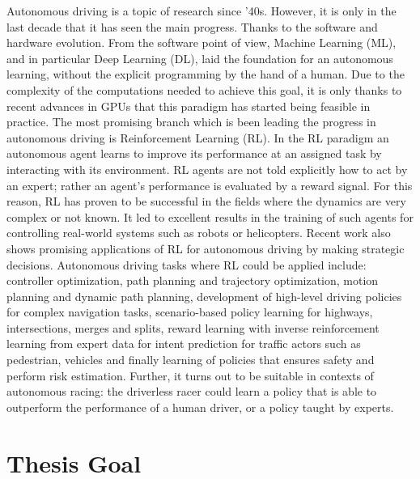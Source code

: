 Autonomous driving is a topic of research since '40s. However, it is only in the last decade that it has seen the main progress. Thanks to the software and hardware evolution. From the software point of view, Machine Learning (ML), and in particular Deep Learning (DL), laid the foundation for an autonomous learning, without the explicit programming by the hand of a human. Due to the complexity of the computations needed to achieve this goal, it is only thanks to recent advances in GPUs that this paradigm has started being feasible in practice.
The most promising branch which is been leading the progress in autonomous driving is Reinforcement Learning (RL). In the RL paradigm an autonomous agent learns to improve its performance at an assigned task by interacting with its environment. RL agents are not told explicitly how to act by an expert; rather an agent’s performance is evaluated by a reward signal.
For this reason, RL has proven to be successful in the fields where the dynamics are very complex or not known.
It led to excellent results in the training of such agents for controlling real-world systems such as robots or helicopters.
Recent work also shows promising applications of RL for autonomous driving by making strategic decisions. 
Autonomous driving tasks where RL could be applied include: controller optimization, path planning and trajectory optimization, motion planning and dynamic path planning, development of high-level driving policies for complex navigation tasks, scenario-based policy learning for highways, intersections, merges and splits, reward learning with inverse reinforcement learning from expert data for intent prediction for traffic actors such as pedestrian, vehicles and finally learning of policies that ensures safety and perform risk estimation. Further, it turns out to be suitable in contexts of autonomous racing: the driverless racer could learn a policy that is able to outperform the performance of a human driver, or a policy taught by experts.

\section{Thesis Goal}

